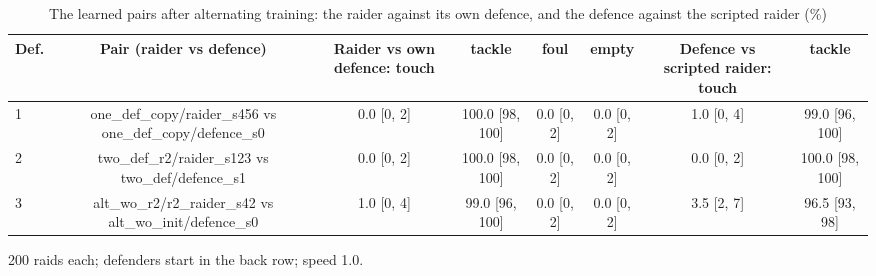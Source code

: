 \begin{table}[t]
\centering
\caption{The learned pairs after alternating training: the raider against its own defence, and the defence against the scripted raider (\%)}
\label{tab:T8_marl_pairs}
\begin{tabular}{lccccccc}
\toprule
Def. & Pair (raider vs defence) & Raider vs own defence: touch & tackle & foul & empty & Defence vs scripted raider: touch & tackle \\
\midrule
1 & one\_def\_copy/raider\_s456 vs one\_def\_copy/defence\_s0 & 0.0 [0, 2] & 100.0 [98, 100] & 0.0 [0, 2] & 0.0 [0, 2] & 1.0 [0, 4] & 99.0 [96, 100] \\
2 & two\_def\_r2/raider\_s123 vs two\_def/defence\_s1 & 0.0 [0, 2] & 100.0 [98, 100] & 0.0 [0, 2] & 0.0 [0, 2] & 0.0 [0, 2] & 100.0 [98, 100] \\
3 & alt\_wo\_r2/r2\_raider\_s42 vs alt\_wo\_init/defence\_s0 & 1.0 [0, 4] & 99.0 [96, 100] & 0.0 [0, 2] & 0.0 [0, 2] & 3.5 [2, 7] & 96.5 [93, 98] \\
\bottomrule
\end{tabular}
\par\smallskip\footnotesize 200 raids each; defenders start in the back row; speed 1.0.
\end{table}
